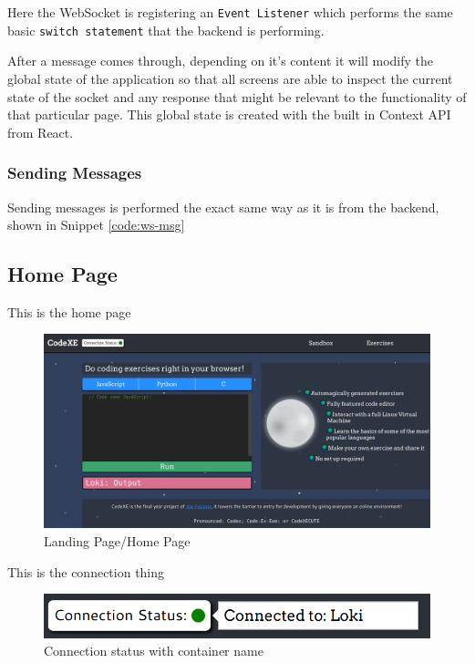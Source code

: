Here the WebSocket is registering an \texttt{Event Listener} which performs the same basic \texttt{switch statement} that the backend is performing.

After a message comes through, depending on it's content it will modify the global state of the application so that all screens are able to inspect the current state of the socket and any response that might be relevant to the functionality of that particular page. This global state is created with the built in Context API from React.

\subsubsection{Sending Messages}

Sending messages is performed the exact same way as it is from the backend, shown in Snippet \ref{code:ws-msg}

\pagebreak

\subsection{Home Page}

This is the home page

\begin{figure}[h!]
    \centering
    \includegraphics[width=\linewidth]{res/home_page.png}
    \caption{Landing Page/Home Page}
    \label{fig:homepage}
\end{figure}

This is the connection thing 

\begin{figure}[h!]
    \centering
    \includegraphics[width=\linewidth]{res/connection_status_with_popout.png}
    \caption{Connection status with container name}
    \label{fig:connection-popout}
\end{figure}


